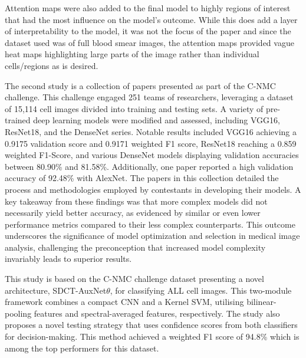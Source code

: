\documentclass[
	a4paper,
	10pt,
	unnumberedsections,
	twoside,
]{research_article}
\begin{document}
Attention maps were also added to the final model to highly regions of interest that had the most influence on the model's outcome. While this does add a layer of interpretability to the model, it was not the focus of the paper and since the dataset used was of full blood smear images, the attention maps provided vague heat maps highlighting large parts of the image rather than individual cells/regions as is desired.

The second study is a collection of papers presented as part of the C-NMC challenge. This challenge engaged 251 teams of researchers, leveraging a dataset of 15,114 cell images divided into training and testing sets. A variety of pre-trained deep learning models were modified and assessed, including VGG16, ResNet18, and the DenseNet series. Notable results included VGG16 achieving a 0.9175 validation score and 0.9171 weighted F1 score, ResNet18 reaching a 0.859 weighted F1-Score, and various DenseNet models displaying validation accuracies between 80.90\% and 81.58\%. Additionally, one paper reported a high validation accuracy of 92.48\% with AlexNet. The papers in this collection detailed the process and methodologies employed by contestants in developing their models. A key takeaway from these findings was that more complex models did not necessarily yield better accuracy, as evidenced by similar or even lower performance metrics compared to their less complex counterparts. This outcome underscores the significance of model optimization and selection in medical image analysis, challenging the preconception that increased model complexity invariably leads to superior results.

This study is based on the C-NMC challenge dataset presenting a novel architecture, SDCT-AuxNet$\theta$, for classifying ALL cell images. This two-module framework combines a compact CNN and a Kernel SVM, utilising bilinear-pooling features and spectral-averaged features, respectively. The study also proposes a novel testing strategy that uses confidence scores from both classifiers for decision-making. This method achieved a weighted F1 score of 94.8\% which is among the top performers for this dataset.
\end{document}
